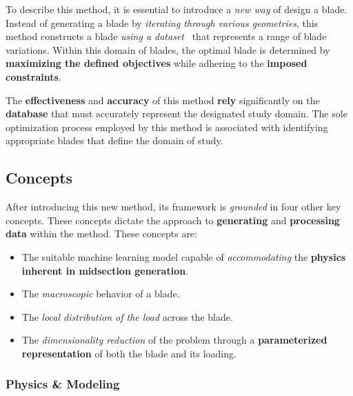 To describe this method, it is essential to introduce a \textit{new way} of design a blade.
Instead of generating a blade by \textit{iterating through various geometries}, 
this method constructs a blade \textit{using a dataset}~\cite{mitchell1997artificial} that represents a range of blade variations. 
Within this domain of blades, the optimal blade is determined by \textbf{maximizing the defined objectives} while adhering to the \textbf{imposed constraints}.

The \textbf{effectiveness} and \textbf{accuracy} of this method \textbf{rely} significantly on the \textbf{database} that must accurately represent the designated study domain. 
The sole optimization process employed by this method is associated with identifying appropriate blades that define the domain of study.

\subsection{Concepts}

After introducing this new method, its framework is \textit{grounded} in four other key concepts. 
These concepts dictate the approach to \textbf{generating} and \textbf{processing data} within the method. 
These concepts are:

\begin{itemize}
    \item The suitable machine learning model capable of \textit{accommodating} the \textbf{physics inherent in midsection generation}.
    \item The \textit{macroscopic} behavior of a blade.
    \item The \textit{local distribution of the load} across the blade.
    \item The \textit{dimensionality reduction} of the problem through a \textbf{parameterized representation} of both the blade and its loading.
\end{itemize}

\subsubsection{Physics \& Modeling}


